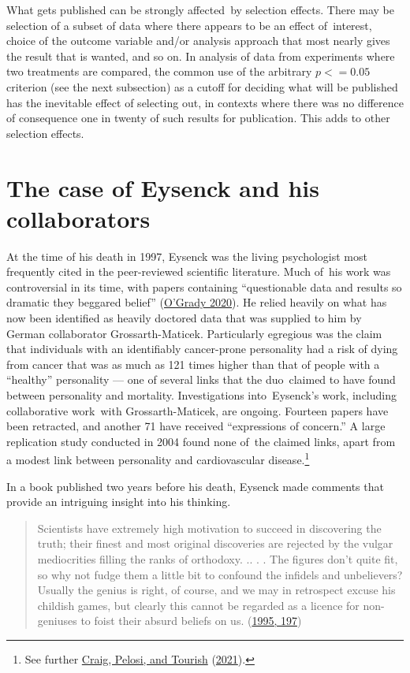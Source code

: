 \documentclass[
  10pt,
  b5paper]{book}
\begin{document}
What gets published can be strongly affected~by selection
effects. There may be selection of a subset of data where
there appears to be an effect of~interest, choice of the
outcome variable and/or analysis approach that most nearly
gives the result that is wanted, and so on. In analysis of
data from experiments where two treatments are compared,
the common use of the arbitrary \(p <= 0.05\) criterion
(see the next subsection) as a cutoff for deciding what
will be published has the inevitable effect of selecting out,
in contexts where there was no difference of consequence
one in twenty of such results for publication. This adds
to other selection effects.

\hypertarget{the-case-of-eysenck-and-his-collaborators}{%
\section{The case of Eysenck and his collaborators}\label{the-case-of-eysenck-and-his-collaborators}}

At the time of his death in 1997, Eysenck was the living psychologist
most frequently cited in the peer-reviewed scientific literature.
Much of~his work was controversial in its time, with papers
containing ``questionable data and results so dramatic they beggared
belief'' (\protect\hyperlink{ref-o2020famous}{O'Grady 2020}). He relied heavily on what has now been
identified as heavily doctored data that was supplied to him by
German collaborator Grossarth-Maticek. Particularly egregious was
the claim that individuals with an identifiably cancer-prone personality
had a risk of dying from cancer that was as much as 121 times higher
than that of people with a ``healthy'' personality --- one of several
links that the duo~claimed to have found between personality and
mortality. Investigations into~Eysenck's work, including
collaborative work~with Grossarth-Maticek, are ongoing. Fourteen
papers have been retracted, and another 71 have received
``expressions of concern.'' A large replication study conducted in
2004 found none of~the claimed links, apart from a modest link between
personality and cardiovascular disease.\footnote{See further \protect\hyperlink{ref-CraigEtAl}{Craig, Pelosi, and Tourish} (\protect\hyperlink{ref-CraigEtAl}{2021}).}

In a book published two years before his death, Eysenck made
comments that provide an intriguing insight into his thinking.

\begin{quote}
Scientists have extremely high motivation to succeed in discovering the truth; their finest and most original discoveries are rejected by the vulgar mediocrities filling the ranks of orthodoxy. .. . . The figures don't quite fit, so why not fudge them a little bit to confound the infidels and unbelievers? Usually the genius is right, of course, and we may in retrospect excuse his childish games, but clearly this cannot be regarded as a licence for non-geniuses to foist their absurd beliefs on us. (\protect\hyperlink{ref-eysenck1995genius}{1995, 197})
\end{quote}
\end{document}
